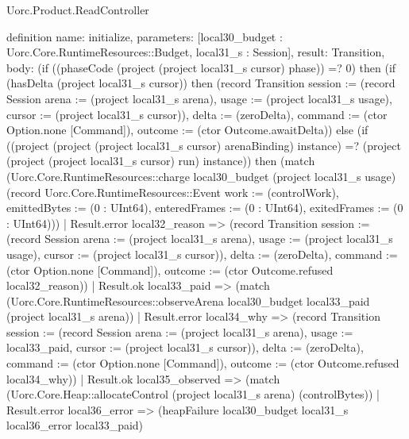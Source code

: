 \begin{lexlean}{Uorc.Product.ReadController}
\begin{semanticmodule}
definition{
  name: initialize,
  parameters: [local30_budget : Uorc.Core.RuntimeResources::Budget, local31_s : Session],
  result: Transition,
  body: (if ((phaseCode (project (project local31_s cursor) phase)) =? 0) then (if (hasDelta (project local31_s cursor)) then (record Transition {session := (record Session {arena := (project local31_s arena), usage := (project local31_s usage), cursor := (project local31_s cursor)}), delta := (zeroDelta), command := (ctor Option.none [Command]), outcome := (ctor Outcome.awaitDelta)}) else (if ((project (project (project local31_s cursor) arenaBinding) instance) =? (project (project (project local31_s cursor) run) instance)) then (match (Uorc.Core.RuntimeResources::charge local30_budget (project local31_s usage) (record Uorc.Core.RuntimeResources::Event {work := (controlWork), emittedBytes := (0 : UInt64), enteredFrames := (0 : UInt64), exitedFrames := (0 : UInt64)}))
    | Result.error local32_reason => (record Transition {session := (record Session {arena := (project local31_s arena), usage := (project local31_s usage), cursor := (project local31_s cursor)}), delta := (zeroDelta), command := (ctor Option.none [Command]), outcome := (ctor Outcome.refused local32_reason)})
    | Result.ok local33_paid => (match (Uorc.Core.RuntimeResources::observeArena local30_budget local33_paid (project local31_s arena))
      | Result.error local34_why => (record Transition {session := (record Session {arena := (project local31_s arena), usage := local33_paid, cursor := (project local31_s cursor)}), delta := (zeroDelta), command := (ctor Option.none [Command]), outcome := (ctor Outcome.refused local34_why)})
      | Result.ok local35_observed => (match (Uorc.Core.Heap::allocateControl (project local31_s arena) (controlBytes))
        | Result.error local36_error => (heapFailure local30_budget local31_s local36_error local33_paid)
}
\end{semanticmodule}
\end{lexlean}
